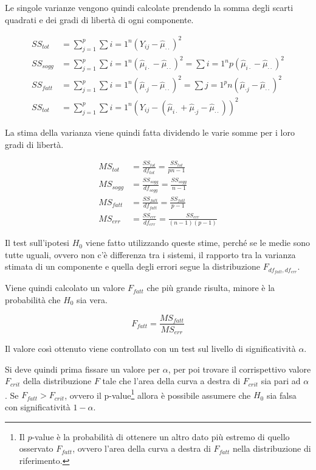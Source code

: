 Le singole varianze vengono quindi calcolate prendendo la somma degli scarti quadrati e dei gradi di libertà di ogni componente.

\begin{align*}
SS_{tot} &= \sum\limits_{j=1}^{p}\sum\limits{i=1}^{n} (Y_{ij} - \hat{\mu}_{\cdot\cdot})^2 \\
SS_{sogg} &= \sum\limits_{j=1}^{p}\sum\limits{i=1}^{n} (\hat{\mu}_{i\cdot} - \hat{\mu}_{\cdot\cdot})^2 = \sum\limits{i=1}^{n} p(\hat{\mu}_{i\cdot} - \hat{\mu}_{\cdot\cdot})^2 \\
SS_{fatt} &= \sum\limits_{j=1}^{p}\sum\limits{i=1}^{n} (\hat{\mu}_{\cdot j} - \hat{\mu}_{\cdot\cdot})^2 = \sum\limits{j=1}^{p} n(\hat{\mu}_{\cdot j} - \hat{\mu}_{\cdot\cdot})^2 \\
SS_{tot} &= \sum\limits_{j=1}^{p}\sum\limits{i=1}^{n} (Y_{ij} - (\hat{\mu}_{i \cdot }+ \hat{\mu}_{\cdot j} - \hat{\mu}_{\cdot \cdot}  ))^2
\end{align*}

La stima della varianza viene quindi fatta dividendo le varie somme per i loro gradi di libertà.

\begin{align*}
MS_{tot} &= \frac{SS_{tot}}{df_{tot}} = \frac{SS_{tot}}{pn-1}\\
MS_{sogg} &= \frac{SS_{sogg}}{df_{sogg}} = \frac{SS_{sogg}}{n-1}\\
MS_{fatt} &= \frac{SS_{fatt}}{df_{fatt}} = \frac{SS_{fatt}}{p-1}\\
MS_{err} &= \frac{SS_{err}}{df_{err}} = \frac{SS_{err}}{(n-1)(p-1)}
\end{align*}

Il test sull'ipotesi $H_0$ viene fatto utilizzando queste stime, perché se le medie sono tutte uguali, ovvero non c'è differenza tra i sistemi, il rapporto tra la varianza stimata di un componente e quella degli errori segue la distribuzione $F_{df_{fatt}, df_{err}}$.

Viene quindi calcolato un valore $F_{fatt}$ che più grande risulta, minore è la probabilità che $H_0$ sia vera.

$$
F_{fatt} = \frac{MS_{fatt}}{MS_{err}}
$$

Il valore così ottenuto viene controllato con un test sul livello di significatività $\alpha$.

Si deve quindi prima fissare un valore per $\alpha$, per poi trovare il corrispettivo valore $F_{crit}$ della distribuzione $F$ tale che l'area della curva a destra di $F_{crit}$ sia pari ad $\alpha$. Se $F_{fatt} > F_{crit}$, ovvero il p-value\footnote{Il $p$-value è la probabilità di ottenere un altro dato più estremo di quello osservato $F_{fatt}$, ovvero l'area della curva a destra di $F_{fatt}$ nella distribuzione di riferimento.} allora è possibile assumere che $H_0$ sia falsa con significatività $1 - \alpha$. 

